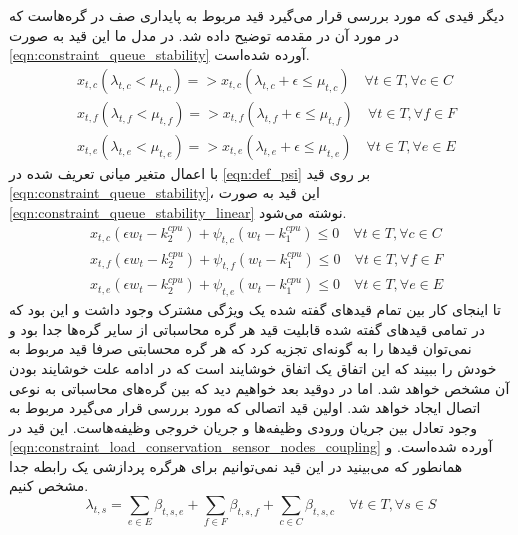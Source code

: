 	دیگر قیدی که مورد بررسی قرار می‌گیرد قید مربوط به پایداری صف در گره‌هاست که در مورد آن در مقدمه توضیح داده شد. در مدل ما این قید به صورت \cref{eqn:constraint_queue_stability} آورده شده‌است.
	\begin{subequations}\label{eqn:constraint_queue_stability}
		\begin{align}
		&x_{t,c}(\lambda_{t,c} < \mu_{t,c}) => x_{t,c}(\lambda_{t,c} + \epsilon \le \mu_{t,c}) \quad \forall{t \in T}, \forall{c \in C}\\
		&x_{t,f}(\lambda_{t,f} < \mu_{t,f}) => x_{t,f}(\lambda_{t,f} + \epsilon \le \mu_{t,f}) \quad \forall{t \in T}, \forall{f \in F} \\
		&x_{t,e}(\lambda_{t,e} < \mu_{t,e}) => x_{t,e}(\lambda_{t,e} + \epsilon \le \mu_{t,e}) \quad \forall{t \in T}, \forall{e \in E}
		\end{align}
	\end{subequations}
	با اعمال متغیر میانی تعریف شده در \cref{eqn:def_psi} بر روی قید \cref{eqn:constraint_queue_stability}، این قید به صورت \cref{eqn:constraint_queue_stability_linear} نوشته می‌شود. 
	\begin{subequations}\label{eqn:constraint_queue_stability_linear}
		\begin{align}
			&x_{t,c}(\epsilon w_t - k_2^{cpu}) + \psi_{t,c}(w_t - k_1^{cpu}) \le 0 \quad \forall{t \in T}, \forall{c \in C} \\
			&x_{t,f}(\epsilon w_t - k_2^{cpu}) + \psi_{t,f}(w_t - k_1^{cpu}) \le 0 \quad \forall{t \in T}, \forall{f \in F} \\
			&x_{t,e}(\epsilon w_t - k_2^{cpu}) + \psi_{t,e}(w_t - k_1^{cpu}) \le 0 \quad \forall{t \in T}, \forall{e \in E}
		\end{align}
	\end{subequations}
	تا اینجای کار بین تمام قیدهای گفته شده یک ویژگی مشترک وجود داشت و این بود که در تمامی قیدهای گفته شده قابلیت قید هر گره محاسباتی از سایر گره‌ها جدا بود و نمی‌توان قیدها را به گونه‌ای تجزیه کرد که هر گره محسابتی صرفا قید مربوط به خودش را ببیند که این اتفاق یک اتفاق خوشایند است که در ادامه علت خوشایند بودن آن مشخص خواهد شد. اما در دوقید بعد خواهیم دید که بین گره‌های محاسباتی به نوعی اتصال ایجاد خواهد شد. 
	اولین قید اتصالی که مورد بررسی قرار می‌گیرد مربوط به وجود تعادل بین جریان ورودی وظیفه‌ها و جریان خروجی وظیفه‌هاست. این قید در \cref{eqn:constraint_load_conservation_sensor_nodes_coupling} آورده شده‌است. و همانطور که می‌بینید در این قید نمی‌توانیم برای هرگره پردازشی یک رابطه جدا مشخص کنیم. 
	\begin{equation}\label{eqn:constraint_load_conservation_sensor_nodes_coupling}
	\lambda_{t,s} = \sum_{e \in E} \beta_{t,s,e} + \sum_{f 	\in F} \beta_{t,s,f}
	+\sum_{c \in C}\beta_{t,s,c} \quad \forall{t \in T}, \forall{s \in S}
	\end{equation} 
